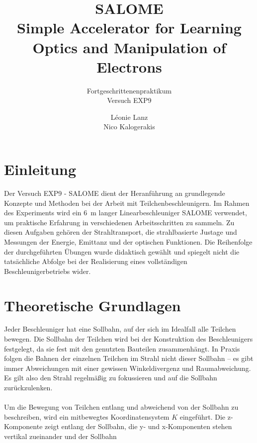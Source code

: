 \documentclass[10pt,a4paper, bibliography=totoc]{scrartcl}
\begin{document}

\title{SALOME\\Simple Accelerator for Learning Optics and
Manipulation of Electrons}
\subtitle{Fortgeschrittenenpraktikum\\ Versuch EXP9}
\author{Léonie Lanz \\ Nico Kalogerakis}
\maketitle
\newpage

\tableofcontents
\vfill
\newpage


\section{Einleitung}
Der Versuch EXP9 - SALOME dient der Heranführung an grundlegende Konzepte und Methoden bei der Arbeit mit Teilchenbeschleunigern. Im Rahmen des Experiments wird ein \qty{6}{\m} langer Linearbeschleuniger SALOME verwendet, um praktische Erfahrung in verschiedenen Arbeitsschritten zu sammeln. Zu diesen Aufgaben gehören der Strahltransport, die strahlbasierte Justage und Messungen der Energie, Emittanz und der optischen Funktionen. Die Reihenfolge der durchgeführten Übungen wurde didaktisch gewählt und spiegelt nicht die tatsächliche Abfolge bei der Realisierung eines vollständigen Beschleunigerbetriebs wider.

\section{Theoretische Grundlagen}
Jeder Beschleuniger hat eine Sollbahn, auf der sich im Idealfall alle Teilchen bewegen. Die Sollbahn der Teilchen wird bei der Konstruktion des Beschleunigers festgelegt, da sie fest mit den genutzten Bauteilen zusammenhängt. In Praxis folgen die Bahnen der einzelnen Teilchen im Strahl nicht dieser Sollbahn -- es gibt immer Abweichungen mit einer gewissen Winkeldivergenz und Raumabweichung. Es gilt also den Strahl regelmäßig zu fokussieren und auf die Sollbahn zurückzulenken. \cite{2}\\\\
Um die Bewegung von Teilchen entlang und abweichend von der Sollbahn zu beschreiben, wird ein mitbewegtes Koordinatensystem $K$ eingeführt. Die z-Komponente zeigt entlang der Sollbahn, die y- und x-Komponenten stehen vertikal zueinander und der Sollbahn \cite{3}
\end{document}
